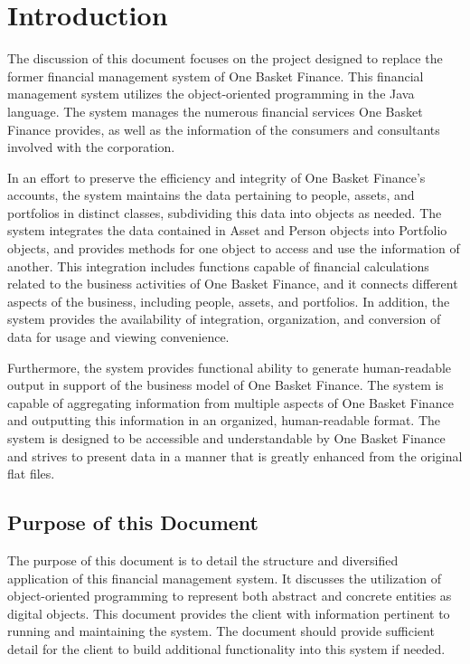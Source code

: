 \documentclass[12pt]{scrartcl} %
\begin{document}
    \newpage
    \section{Introduction}

    The discussion of this document focuses on the project designed to replace the former financial management system of One Basket Finance.  This financial management system utilizes the object-oriented programming in the Java language.  The system manages the numerous financial services One Basket Finance provides, as well as the information of the consumers and consultants involved with the corporation.

    In an effort to preserve the efficiency and integrity of One Basket Finance's accounts, the system maintains the data pertaining to people, assets, and portfolios in distinct classes, subdividing this data into objects as needed.  The system integrates the data contained in Asset and Person objects into Portfolio objects, and provides methods for one object to access and use the information of another.  This integration includes functions capable of financial calculations related to the business activities of One Basket Finance, and it connects different aspects of the business, including people, assets, and portfolios. In addition, the system provides the availability of integration, organization, and conversion of data for usage and viewing convenience.

    Furthermore, the system provides functional ability to generate human-readable output in support of the business model of One Basket Finance.  The system is capable of aggregating information from multiple aspects of One Basket Finance and outputting this information in an organized, human-readable format.  The system is designed to be accessible and understandable by One Basket Finance and strives to present data in a manner that is greatly enhanced from the original flat files.

    \subsection{Purpose of this Document}

    The purpose of this document is to detail the structure and diversified application of this financial management system.  It discusses the utilization of object-oriented programming to represent both abstract and concrete entities as digital objects.  This document provides the client with information pertinent to running and maintaining the system.  The document should provide sufficient detail for the client to build additional functionality into this system if needed.
\end{document}
